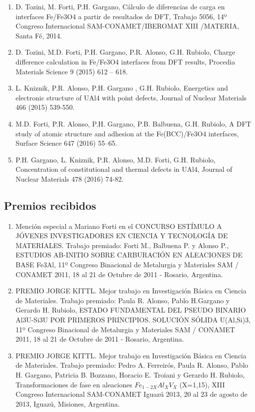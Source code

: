 \begin{enumerate}
\item  D. Tozini, M. Forti, P.H. Gargano, Cálculo de diferencias de carga en 
interfaces Fe/Fe3O4 a partir de resultados de DFT, Trabajo 5056, 14º Congreso 
Internacional SAM-CONAMET/IBEROMAT XIII /MATERIA, Santa Fé, 2014.

\item  D. Tozini, M.D. Forti, P.H. Gargano, P.R. Alonso, G.H. Rubiolo, 
Charge difference calculation in Fe/Fe3O4 interfaces from DFT results, Procedia 
Materials Science 9 (2015) 612 – 618.

\item L. Kniznik, P.R. Alonso, P.H. Gargano , G.H. Rubiolo, Energetics and 
electronic structure of UAl4 with point defects, Journal of Nuclear Materials 
466 (2015) 539-550.

\item M.D. Forti, P.R. Alonso, P.H. Gargano, P.B. Balbuena, G.H. Rubiolo, A 
DFT study of atomic structure and adhesion at the Fe(BCC)/Fe3O4 interfaces, 
Surface Science 647 (2016) 55–65.

\item  P.H. Gargano, L. Kniznik, P.R. Alonso, M.D. Forti, G.H. Rubiolo, 
Concentration of constitutional and thermal defects in UAl4, Journal of Nuclear 
Materials 478 (2016) 74-82.
\end{enumerate}

\subsection{ Premios recibidos }

\begin{enumerate} 


\item  Mención especial a Mariano Forti en el CONCURSO ESTÍMULO A JÓVENES 
INVESTIGADORES EN CIENCIA Y TECNOLOGÍA DE MATERIALES. Trabajo premiado: Forti 
M., Balbuena P. y Alonso P., ESTUDIOS AB-INITIO SOBRE CARBURACIÓN EN ALEACIONES 
DE BASE Fe3Al, 11º Congreso Binacional de Metalurgia y Materiales SAM / CONAMET 
2011, 18 al 21 de Octubre de 2011 - Rosario, Argentina.

\item  PREMIO JORGE KITTL. Mejor trabajo en Investigación Básica en Ciencia 
de Materiales. Trabajo premiado: Paula R. Alonso, Pablo H.Gargano y Gerardo H. 
Rubiolo, ESTADO FUNDAMENTAL DEL PSEUDO BINARIO Al3U-Si3U POR PRIMEROS 
PRINCIPIOS. SOLUCIÓN SÓLIDA U(Al,Si)3, 11º Congreso Binacional de Metalurgia y 
Materiales SAM / CONAMET 2011, 18 al 21 de Octubre de 2011 - Rosario, Argentina.

\item  PREMIO JORGE KITTL. Mejor trabajo en Investigación Básica en Ciencia 
de Materiales. Trabajo premiado: Pedro A. Ferreirós, Paula R. Alonso, Pablo H. 
Gargano, Patricia B. Bozzano, Horacio E. Troiani y Gerardo H. Rubiolo, 
    Transformaciones de fase en aleaciones $Fe_{1-2X}Al_X V_X$ (X=1,15), XIII Congreso 
Internacional SAM-CONAMET Iguazú 2013, 20 al 23 de agosto de 2013, Iguazú, 
Misiones, Argentina.

\end{enumerate}

